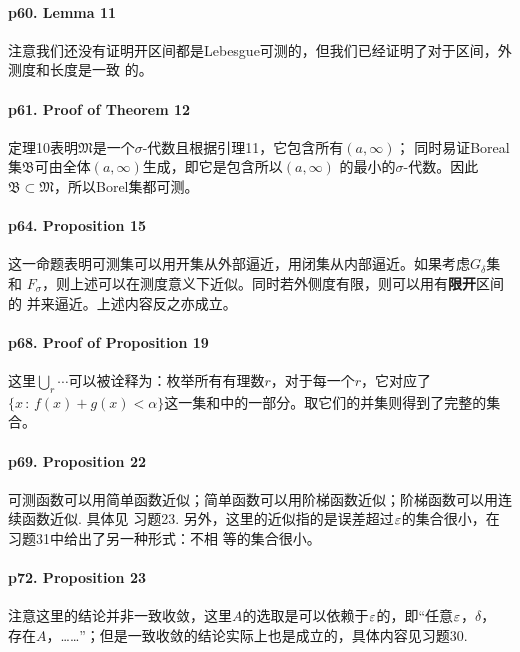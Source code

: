   \paragraph{p60. Lemma 11}
    注意我们还没有证明开区间都是Lebesgue可测的，但我们已经证明了对于区间，外测度和长度是一致
    的。

  \paragraph{p61. Proof of Theorem 12}
    定理10表明$\mathfrak{M}$是一个$\sigma$-代数且根据引理11，它包含所有$(a,\infty)$；
    同时易证Boreal集$\mathfrak{B}$可由全体$(a,\infty)$生成，即它是包含所以$(a,\infty)$
    的最小的$\sigma$-代数。因此$\mathfrak{B}\subset\mathfrak{M}$，所以Borel集都可测。

  \paragraph{p64. Proposition 15}
    这一命题表明可测集可以用开集从外部逼近，用闭集从内部逼近。如果考虑$G_\delta$集和
    $F_\sigma$，则上述可以在测度意义下近似。同时若外侧度有限，则可以用有\textbf{限开}区间的
    并来逼近。上述内容反之亦成立。

  \paragraph{p68. Proof of Proposition 19}
    这里$\bigcup_r\cdots$可以被诠释为：枚举所有有理数$r$，对于每一个$r$，它对应了$\{x\,:
    \,f(x)+g(x)<\alpha\}$这一集和中的一部分。取它们的并集则得到了完整的集合。

  \paragraph{p69. Proposition 22}
    可测函数可以用简单函数近似；简单函数可以用阶梯函数近似；阶梯函数可以用连续函数近似. 具体见
    习题23. 另外，这里的近似指的是误差超过$\varepsilon$的集合很小，在习题31中给出了另一种形式：不相
    等的集合很小。

  \paragraph{p72. Proposition 23}
    注意这里的结论并非一致收敛，这里$A$的选取是可以依赖于$\varepsilon$的，即“任意$\varepsilon$，$\delta$，
    存在$A$，……”；但是一致收敛的结论实际上也是成立的，具体内容见习题30.



